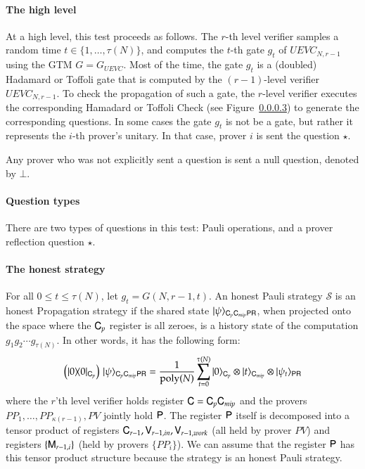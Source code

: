 \paragraph{The high level}  At a high level, this test  proceeds as follows. The $r$-th level verifier samples a random time $t \in \{1,\ldots,\tau(N)\}$, and computes the $t$-th gate $g_t$ of $UEVC_{N,r-1}$ using the GTM $G = G_{UEVC}$. Most of the time, the gate $g_t$ is a (doubled) Hadamard or Toffoli gate that is computed by the $(r-1)$-level verifier $UEVC_{N,r-1}$. To check the propagation of such a gate, the $r$-level verifier executes the corresponding Hamadard or Toffoli Check (see Figure~\ref{}) to generate the corresponding questions. %
In some cases the gate $g_t$ is not be a gate, but rather it represents the $i$-th prover's unitary. In that case, prover $i$ is sent the question $\star$.  

Any prover who was not explicitly sent a question is sent a null question, denoted by $\bot$.

\paragraph{Question types} There are two types of questions in this test: Pauli operations, and a prover reflection question $\star$.


\paragraph{The honest strategy} For all $0 \leq t \leq \tau(N)$, let $g_t = G(N,r-1,t)$. An honest Pauli strategy $\mathcal{S}$ is an honest Propagation strategy if the shared state $|\psi\rangle_{{\mathsf{C}}_p {\mathsf{C}}_{mip} {\mathsf{P}} {\mathsf{R}}}$, when projected onto the space where the ${\mathsf{C}}_p$ register is all zeroes, is a history state of the computation $g_1g_2\cdots g_{\tau(N)}$. In other words, it has the following form:
\[
	\left( |0\rangle\! \langle 0|_{{\mathsf{C}}_p} \right) \, |\psi\rangle_{{\mathsf{C}}_p {\mathsf{C}}_{mip} {\mathsf{P}} {\mathsf{R}}} = \frac{1}{\operatorname{poly}(N)} \sum_{t = 0}^{\tau(N)} |0\rangle_{{\mathsf{C}}_p} \otimes |t\rangle_{{\mathsf{C}}_{mip}} \otimes |\psi_t\rangle_{{\mathsf{P}} {\mathsf{R}}}
\]
where the $r$'th level verifier holds register ${\mathsf{C}} = {\mathsf{C}}_p {\mathsf{C}}_{mip}$ and the provers $PP_1,\ldots,PP_{\kappa(r-1)},PV$ jointly hold ${\mathsf{P}}$. The register ${\mathsf{P}}$ itself is decomposed into a tensor product of registers ${\mathsf{C}}_{r-1}, {\mathsf{V}}_{r-1,in}, {\mathsf{V}}_{r-1,work}$ (all held by prover $PV$) and registers $\{ {\mathsf{M}}_{r-1,i} \}$ (held by provers $\{ PP_i \}$). We can assume that the register ${\mathsf{P}}$ has this tensor product structure because the strategy is an honest Pauli strategy. %

